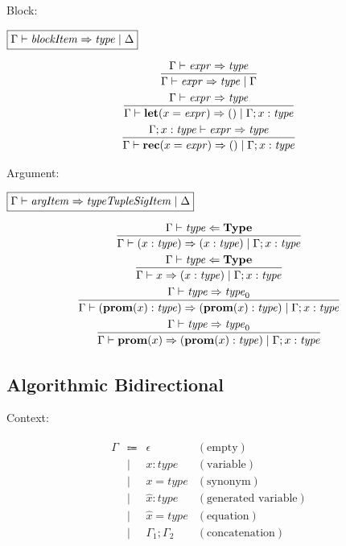 Block:

$\fbox{$\Gamma \vdash \mathit{blockItem} \Rightarrow \mathit{type} \mid \Delta$}$

\begin{gather*}
  \infer{\Gamma \vdash \mathit{expr} \Rightarrow \mathit{type} \mid \Gamma}{
    \Gamma \vdash \mathit{expr} \Rightarrow \mathit{type}
  }
  \\
  \infer{\Gamma \vdash \mathbf{let}(x = \mathit{expr}) \Rightarrow () \mid \Gamma; x: \mathit{type}}{
    \Gamma \vdash \mathit{expr} \Rightarrow \mathit{type}
  }
  \\
  \infer{\Gamma \vdash \mathbf{rec}(x = \mathit{expr}) \Rightarrow () \mid \Gamma; x: \mathit{type}}{
    \Gamma; x: \mathit{type} \vdash \mathit{expr} \Rightarrow \mathit{type}
  }
\end{gather*}

Argument:

$\fbox{$\Gamma \vdash \mathit{argItem} \Rightarrow \mathit{typeTupleSigItem} \mid \Delta$}$

\begin{gather*}
  \infer{\Gamma \vdash (x: \mathit{type}) \Rightarrow (x: \mathit{type}) \mid \Gamma; x: \mathit{type}}{
    \Gamma \vdash \mathit{type} \Leftarrow \mathbf{Type}
  }
  \\
  \infer{\Gamma \vdash x \Rightarrow (x: \mathit{type}) \mid \Gamma; x: \mathit{type}}{
    \Gamma \vdash \mathit{type} \Leftarrow \mathbf{Type}
  }
  \\
  \infer{\Gamma \vdash (\mathbf{prom}(x): \mathit{type}) \Rightarrow (\mathbf{prom}(x): \mathit{type}) \mid \Gamma; x: \mathit{type}}{
    \Gamma \vdash \mathit{type} \Rightarrow \mathit{type}_0
  }
  \\
  \infer{\Gamma \vdash \mathbf{prom}(x) \Rightarrow (\mathbf{prom}(x): \mathit{type}) \mid \Gamma; x: \mathit{type}}{
    \Gamma \vdash \mathit{type} \Rightarrow \mathit{type}_0
  }
\end{gather*}

\subsection{Algorithmic Bidirectional}

Context:

\begin{align*}
  \begin{array}{rclr}
    \Gamma
    & \Coloneq & \epsilon &(\text{empty}) \\
    & \mid & x: \mathit{type} &(\text{variable}) \\
    & \mid & x = \mathit{type} &(\text{synonym}) \\
    & \mid & \hat{x}: \mathit{type} &(\text{generated variable}) \\
    & \mid & \hat{x} = \mathit{type} &(\text{equation}) \\
    & \mid & \Gamma_1; \Gamma_2 &(\text{concatenation})
  \end{array}
\end{align*}

